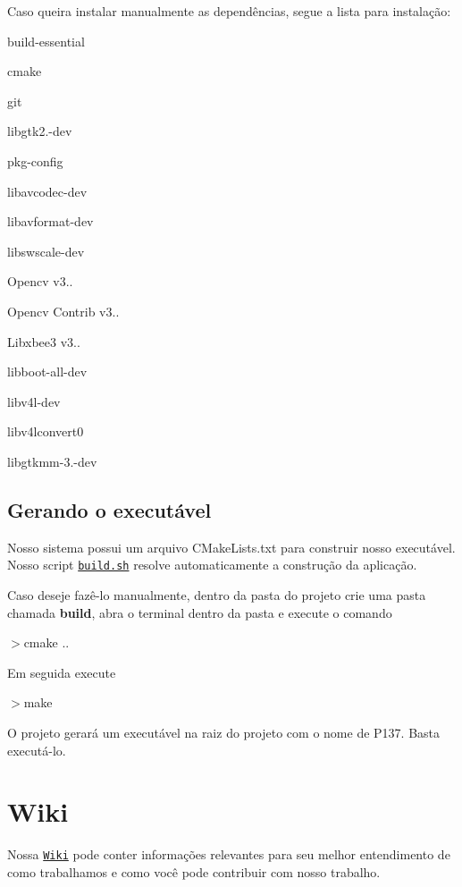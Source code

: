 Caso queira instalar manualmente as dependências, segue a lista para instalação\+:


\begin{DoxyItemize}
\item build-\/essential
\item cmake
\item git
\item libgtk2.-\/dev
\item pkg-\/config
\item libavcodec-\/dev
\item libavformat-\/dev
\item libswscale-\/dev
\item Opencv v3..
\item Opencv Contrib v3..
\item Libxbee3 v3..
\item libboot-\/all-\/dev
\item libv4l-\/dev
\item libv4lconvert0
\item libgtkmm-\/3.-\/dev
\end{DoxyItemize}

\subsection*{Gerando o executável}

Nosso sistema possui um arquivo C\+Make\+Lists.\+txt para construir nosso executável. Nosso script \href{https://github.com/PEQUI-MEC/VSSS-INF/blob/master/build.sh}{\tt build.\+sh} resolve automaticamente a construção da aplicação.

Caso deseje fazê-\/lo manualmente, dentro da pasta do projeto crie uma pasta chamada {\bfseries build}, abra o terminal dentro da pasta e execute o comando

$>$cmake ..

Em seguida execute

$>$make

O projeto gerará um executável na raiz do projeto com o nome de P137. Basta executá-\/lo.

\section*{Wiki}

Nossa \href{https://github.com/PEQUI-MEC/VSSS-INF/wiki}{\tt Wiki} pode conter informações relevantes para seu melhor entendimento de como trabalhamos e como você pode contribuir com nosso trabalho.

